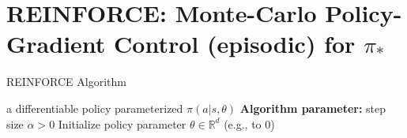 \documentclass[../xlapes02]{subfiles}
\begin{document}


    \section{REINFORCE: Monte-Carlo Policy-Gradient Control (episodic) for $\pi_*$}
    \begin{algorithm}[h!]
        \caption{REINFORCE Algorithm}
        \label{alg:REINFORCE}

        a differentiable policy parameterized $\pi(a|s, \theta)$\;
        \textbf{Algorithm parameter:} step size $\alpha > 0$\;
        Initialize policy parameter $\theta \in \mathbb{R}^d$ (e.g., to 0)\;

    \end{algorithm}
\end{document}
